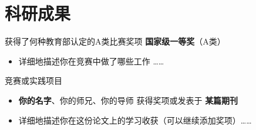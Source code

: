 \documentclass[11pt]{article}
\newlength{\iconwidth}
\begin{document}
    \begin{minipage}[t]{\textwidth}
    \section[科研竞赛]{\makebox[\iconwidth][c]{\color{primary_color}{\faAtom}}\quad 科研成果}

    获得了何种教育部认定的A类比赛奖项 \hfill  \textbf{国家级一等奖}（A类）
    \begin{itemize}

        \item 详细地描述你在竞赛中做了哪些工作 \dots\dots
    \end{itemize}

    \vspace{0.5em}
    竞赛或实践项目
    \begin{itemize}
        \item  \textbf{你的名字}、你的师兄、你的导师 \hfill 获得奖项或发表于 \textbf{某篇期刊} 
        \item 详细地描述你在这份论文上的学习收获（可以继续添加奖项）\dots\dots
    \end{itemize}
    
    \vspace{1.2em}
    \end{minipage}
\end{document}
